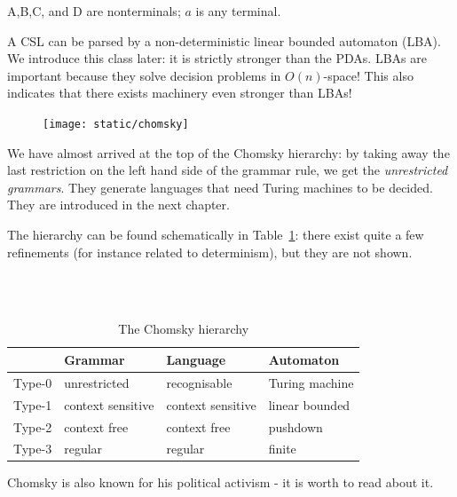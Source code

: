 A,B,C, and D are nonterminals; $a$ is any terminal.


A CSL can be parsed by a non-deterministic linear bounded automaton
(LBA). We introduce this class later: it is strictly stronger than the
PDAs. LBAs are important because they solve decision problems in
$O(n)$-space! This also indicates that there exists machinery even
stronger than LBAs!


\begin{figure}
\texttt{[image: static/chomsky]}
\end{figure}
We have almost arrived at the top of the Chomsky hierarchy: by taking
away the last restriction on the left hand side of the grammar rule,
we get the {\em unrestricted grammars}. They generate languages that
need Turing machines to be decided. They are introduced in the next
chapter.

The hierarchy can be found schematically in Table~\ref{chomskyhier}:
there exist quite a few refinements (for instance related to
determinism), but they are not shown.

~\\
~\\
\begin{table}[ht]
\center
\begin{tabular}{|l|l|l|l|}
\hline
         & Grammar          & Language              & Automaton \\ \hline
Type-0   & unrestricted        & recognisable      & Turing machine \\
Type-1   & context sensitive   & context sensitive & linear bounded   \\
Type-2   & context free        & context free      & pushdown \\
Type-3   & regular            & regular          & finite  \\
\hline
\end{tabular}
\caption{The Chomsky hierarchy} \label{chomskyhier}
\end{table}


Chomsky is also known for his political activism - it is worth to read
about it.





